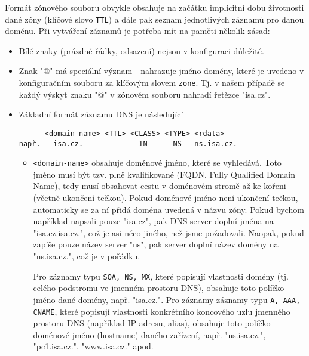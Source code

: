 Formát zónového souboru obvykle obsahuje na začátku implicitní dobu životnosti dané zóny (klíčové slovo {\tt TTL}) a dále pak seznam jednotlivých záznamů pro danou doménu. Při vytváření záznamů je potřeba mít na paměti několik zásad:
\begin{itemize}
  \item Bílé znaky (prázdné řádky, odsazení) nejsou v konfiguraci důležité.
  \item Znak "@" má speciální význam - nahrazuje jméno domény, které je uvedeno v konfiguračním souboru za klíčovým slovem {\tt zone}. Tj. v našem případě se každý výskyt znaku "@" v zónovém souboru nahradí řetězce "isa.cz".
  \item Základní formát záznamu DNS je následující
\begin{verbatim}
      <domain-name> <TTL> <CLASS> <TYPE> <rdata>
např.   isa.cz.             IN      NS   ns.isa.cz.
\end{verbatim}
  \begin{itemize}
    \item \verb|<domain-name>| obsahuje doménové jméno, které se vyhledává. Toto jméno musí být tzv. plně kvalifikované (FQDN, Fully Qualified Domain Name), tedy musí obsahovat cestu v doménovém stromě až ke kořeni (včetně ukončení tečkou). Pokud doménové jméno není ukončení tečkou, automaticky se za ní přidá doména uvedená v názvu zóny. Pokud bychom například napsali pouze "isa.cz", pak DNS server doplní jména na "isa.cz.isa.cz.", což je asi něco jiného, než jsme požadovali. Naopak, pokud zapíše pouze název server "ns", pak server doplní název domény na "ns.isa.cz.", což je v pořádku.
    
    Pro záznamy typu {\tt SOA, NS, MX}, které popisují vlastnosti domény (tj. celého podstromu ve jmenném prostoru DNS), obsahuje toto políčko jméno dané domény, např. "isa.cz.". Pro záznamy záznamy typu {\tt A, AAA, CNAME}, které popisují vlastnosti konkrétního koncového uzlu jmenného prostoru DNS (například IP adresu, alias), obsahuje toto políčko doménové jméno (hostname) daného zařízení, např. "ns.isa.cz.", "pc1.isa.cz.", "www.isa.cz." apod. 
    

\end{itemize}
\end{itemize}
